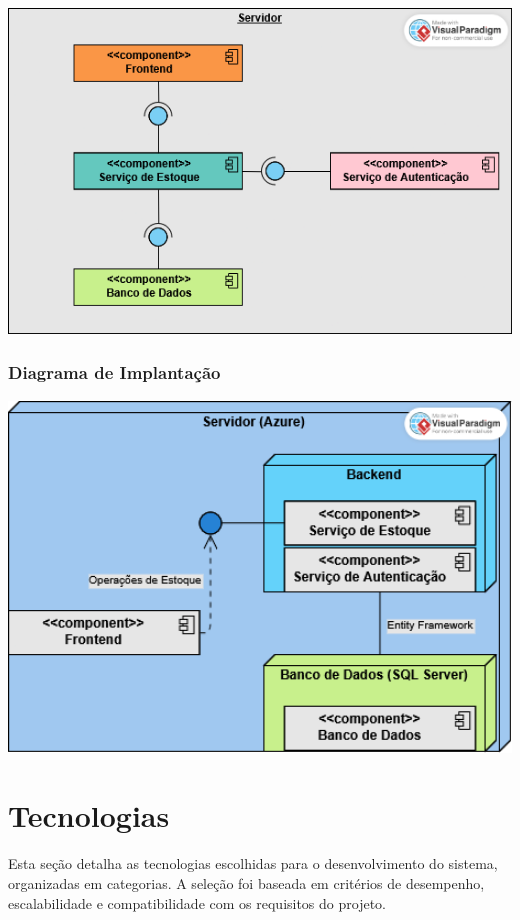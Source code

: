 \documentclass[
	12pt,				%
	openany,			%
	twoside,			%
	a4paper,			%
	english,			%
	brazil				%
	]{abntex2}
\begin{document}
\includegraphics[width=1.0\textwidth]{Figuras/Componentes.png}


\subsubsection{Diagrama de Implantação}


\includegraphics[width=1.0\textwidth]{Figuras/Implantação.png}



\section{Tecnologias}

Esta seção detalha as tecnologias escolhidas para o desenvolvimento do sistema, organizadas em categorias. A seleção foi baseada em critérios de desempenho, escalabilidade e compatibilidade com os requisitos do projeto.
\end{document}
